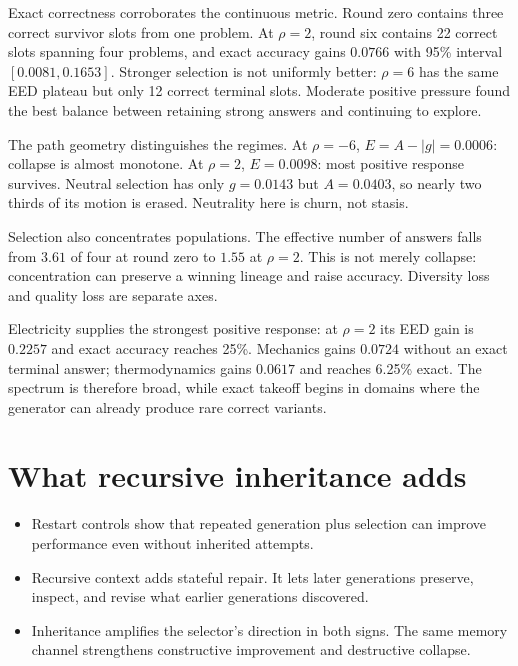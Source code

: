 \documentclass[10pt]{article}
\begin{document}
Exact correctness corroborates the continuous metric. Round zero contains three correct survivor slots from one problem. At $\rho=2$, round six contains 22 correct slots spanning four problems, and exact accuracy gains $0.0766$ with 95\% interval $[0.0081,0.1653]$. Stronger selection is not uniformly better: $\rho=6$ has the same EED plateau but only 12 correct terminal slots. Moderate positive pressure found the best balance between retaining strong answers and continuing to explore.

The path geometry distinguishes the regimes. At $\rho=-6$, $E=A-|g|=0.0006$: collapse is almost monotone. At $\rho=2$, $E=0.0098$: most positive response survives. Neutral selection has only $g=0.0143$ but $A=0.0403$, so nearly two thirds of its motion is erased. Neutrality here is churn, not stasis.

Selection also concentrates populations. The effective number of answers falls from $3.61$ of four at round zero to $1.55$ at $\rho=2$. This is not merely collapse: concentration can preserve a winning lineage and raise accuracy. Diversity loss and quality loss are separate axes.

Electricity supplies the strongest positive response: at $\rho=2$ its EED gain is $0.2257$ and exact accuracy reaches 25\%. Mechanics gains $0.0724$ without an exact terminal answer; thermodynamics gains $0.0617$ and reaches 6.25\% exact. The spectrum is therefore broad, while exact takeoff begins in domains where the generator can already produce rare correct variants.

\section{What recursive inheritance adds}

\begin{conceptbox}
\begin{itemize}[leftmargin=1.15em,itemsep=0.18em,topsep=0.05em]
\item Restart controls show that repeated generation plus selection can improve performance even without inherited attempts.
\item Recursive context adds stateful repair. It lets later generations preserve, inspect, and revise what earlier generations discovered.
\item Inheritance amplifies the selector's direction in both signs. The same memory channel strengthens constructive improvement and destructive collapse.
\end{itemize}
\end{conceptbox}
\end{document}
